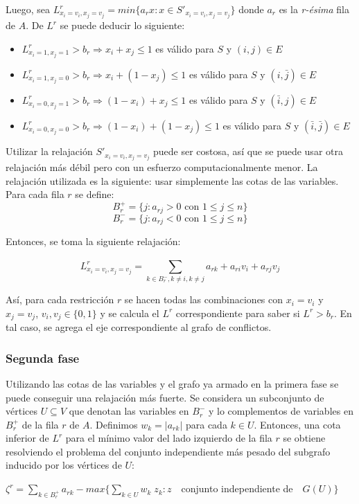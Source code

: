 Luego, sea $L^r_{x_i=v_i,x_j=v_j} = min\{a_rx : x\in S'_{x_i=v_i,x_j=v_j}\}$ donde $a_r$ es la \textit{r-\'esima} fila de $A$. De $L^r$ se puede deducir lo siguiente:
\begin{itemize}
\item $L^r_{x_i=1,x_j=1} > b_r \Longrightarrow x_i + x_j \leq 1$ es v\'alido para $S$ y $(i,j)\in E$
\item $L^r_{x_i=1,x_j=0} > b_r \Longrightarrow x_i + (1-x_j) \leq 1$ es v\'alido para $S$ y $(i,\bar{j})\in E$ 
\item $L^r_{x_i=0,x_j=1} > b_r \Longrightarrow (1-x_i) + x_j \leq 1$ es v\'alido para $S$ y $(\bar{i},j)\in E$ 
\item $L^r_{x_i=0,x_j=0} > b_r \Longrightarrow (1-x_i) + (1-x_j) \leq 1$ es v\'alido para $S$ y $(\bar{i},\bar{j})\in E$
\end{itemize}

Utilizar la relajaci\'on $S'_{x_i=v_i,x_j=v_j}$ puede ser costosa, as\'i que se puede usar otra relajaci\'on m\'as d\'ebil pero con un esfuerzo computacionalmente menor. La relajaci\'on utilizada es la siguiente: usar simplemente las cotas de las variables. Para cada fila $r$ se define: \\ 
$$B^+_r = \{j: a_{rj} > 0 \text{ con } 1\leq j \leq n\}$$
$$B^-_r = \{j: a_{rj} < 0 \text{ con } 1\leq j \leq n\}$$

Entonces, se toma la siguiente relajaci\'on: 

$$L^r_{x_i=v_i,x_j=v_j} = \overset{}{\underset{k\in B^-_r,k\neq i,k\neq j}{\sum}} a_{rk} + a_{ri}v_i + a_{rj}v_j$$

As\'i, para cada restricci\'on $r$ se hacen todas las combinaciones con $x_i = v_i$ y $x_j = v_j$, $v_i,v_j\in \{0,1\}$ y se calcula el $L^r$ correspondiente para saber si $L^r > b_r$. En tal caso, se agrega el eje correspondiente al grafo de conflictos.

\subsubsection*{Segunda fase}

Utilizando las cotas de las variables y el grafo ya armado en la primera fase se puede conseguir una relajaci\'on m\'as fuerte. Se considera un subconjunto de v\'ertices $U \subseteq V$ que denotan las variables en $B^-_r$ y lo complementos de variables en $B^+_r$ de la fila $r$ de $A$. Definimos $w_k = |a_{rk}|$ para cada $k\in U$. Entonces, una cota inferior de $L^r$ para el m\'inimo valor del lado izquierdo de la fila $r$ se obtiene resolviendo el problema del conjunto independiente m\'as pesado del subgrafo inducido por los vértices de $U$:
\begin{center}
$\zeta^r = \sum_{k\in B^+_r}a_{rk} - max\{\sum_{k\in U}w_k\;z_k : z\quad$conjunto independiente de$\quad G(U)\}$
\end{center}


